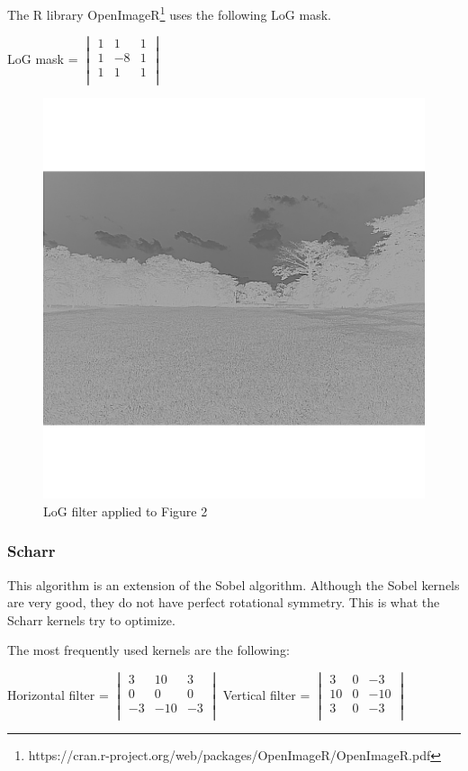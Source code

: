 \documentclass[12pt]{article}
\begin{document}
The R library OpenImageR\footnote{https://cran.r-project.org/web/packages/OpenImageR/OpenImageR.pdf} uses the following LoG mask.
\newline

LoG mask = $\begin{vmatrix}
        1 & 1 & 1\\
        1 & -8 & 1\\
        1 & 1 & 1\\
\end{vmatrix}$

\begin{figure}[h]
\centering
\includegraphics[scale = 0.45]{img/landscape_LoG}
\caption{LoG filter applied to Figure 2}
\end{figure}

\subsubsection{Scharr}
This algorithm is an extension of the Sobel algorithm. Although the Sobel kernels are very good, they do not have perfect rotational symmetry. This is what the Scharr kernels try to optimize.
\newline

The most frequently used kernels are the following:
\newline

Horizontal filter = $\begin{vmatrix}
        3 & 10 & 3\\
        0 & 0 & 0\\
        -3 & -10 & -3\\
\end{vmatrix}$\hspace{11mm}
Vertical filter = $\begin{vmatrix}
        3 & 0 & -3\\
        10 & 0 & -10\\
        3 & 0 & -3\\
\end{vmatrix}$\hspace{5mm}
\end{document}
